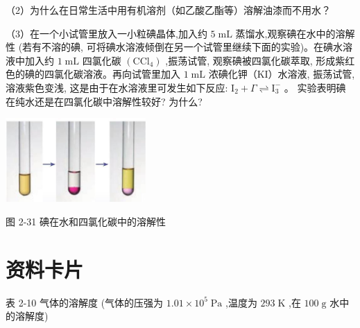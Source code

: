 \documentclass[10pt]{article}
\begin{document}
（2）为什么在日常生活中用有机溶剂（如乙酸乙酯等）溶解油漆而不用水？

（3）在一个小试管里放入一小粒碘晶体,加入约 \(5\mathrm{\;{mL}}\) 蒸馏水,观察碘在水中的溶解性 (若有不溶的碘, 可将碘水溶液倾倒在另一个试管里继续下面的实验)。在碘水溶液中加入约 \(1\mathrm{\;{mL}}\) 四氯化碳 \(\left( {\mathrm{{CCl}}}_{4}\right)\) ,振荡试管, 观察碘被四氯化碳萃取, 形成紫红色的碘的四氯化碳溶液。再向试管里加入 \(1\mathrm{\;{mL}}\) 浓碘化钾（KI）水溶液, 振荡试管, 溶液紫色变浅, 这是由于在水溶液里可发生如下反应: \({\mathrm{I}}_{2} + \Gamma \rightleftharpoons {\mathrm{I}}_{3}^{ - }\) 。 实验表明碘在纯水还是在四氯化碳中溶解性较好? 为什么?

\begin{center}
\includegraphics[max width=0.4\textwidth]{images/0190e026-5a11-7df7-bd27-54d09026ba7a_62_564932.jpg}
\end{center}

图 2-31 碘在水和四氯化碳中的溶解性

\section*{资料卡片}

表 2-10 气体的溶解度 (气体的压强为 \({1.01} \times {10}^{5}\mathrm{\;{Pa}}\) ,温度为 \({293}\mathrm{\;K}\) ,在 \({100}\mathrm{\;g}\) 水中的溶解度)

\begin{center}
\end{center}
\end{document}
